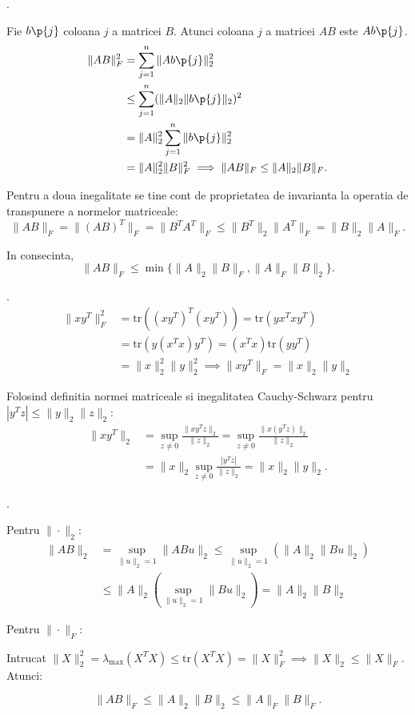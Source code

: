\newpage

\begin{demonstratie}

    . 
    
    Fie $b\p{j}$ coloana $j$ a matricei $B$. Atunci coloana $j$ a matricei $AB$ este $A b\p{j}$.
    \begin{align*}
    \|AB\|_F^2 &= \sum_{j=1}^n \|A b\p{j}\|_2^2 \\
    &\leq \sum_{j=1}^n (\|A\|_2 \|b\p{j}\|_2)^2 \\
    &= \|A\|_2^2 \sum_{j=1}^n \|b\p{j}\|_2^2 \\
    &= \|A\|_2^2 \|B\|_F^2 \implies \|AB\|_F \leq \|A\|_2 \|B\|_F.
    \end{align*}

    Pentru a doua inegalitate se tine cont de proprietatea de invarianta la operatia de transpunere a normelor matriceale:
    $$ \|AB\|_F = \|(AB)^T\|_F = \|B^T A^T\|_F \leq \|B^T\|_2 \|A^T\|_F = \|B\|_2 \|A\|_F. $$

    In consecinta,
    $$ \|AB\|_F \leq \min \{ \|A\|_2 \|B\|_F, \|A\|_F \|B\|_2 \}. $$

    .  
    \begin{align*}
    \|xy^T\|_F^2 &= \text{tr}((xy^T)^T (xy^T)) = \text{tr}(y x^T x y^T) \\
    &= \text{tr}(y (x^T x) y^T) = (x^T x) \text{tr}(yy^T) \\
    &= \|x\|_2^2 \|y\|_2^2 \implies \|xy^T\|_F = \|x\|_2 \|y\|_2
    \end{align*}

    Folosind definitia normei matriceale si inegalitatea Cauchy-Schwarz pentru $ |y^T z| \leq \|y\|_2 \|z\|_2$:
    \begin{align*}
    \|xy^T\|_2 &= \sup_{z \neq 0} \frac{\|x y^T z\|_2}{\|z\|_2} = \sup_{z \neq 0} \frac{\|x (y^T z)\|_2}{\|z\|_2} \\
    &= \|x\|_2 \sup_{z \neq 0} \frac{|y^T z|}{\|z\|_2} = \|x\|_2 \|y\|_2.
    \end{align*}

    .

    Pentru $\|\cdot\|_2$:
    \begin{align*}
    \|AB\|_2 &= \sup_{\|u\|_2=1} \|ABu\|_2 \leq \sup_{\|u\|_2=1} (\|A\|_2 \|Bu\|_2) \\
    &\leq \|A\|_2 \left( \sup_{\|u\|_2=1} \|Bu\|_2 \right) = \|A\|_2 \|B\|_2
    \end{align*}

    Pentru $\|\cdot\|_F$:

    Intrucat $\|X\|_2^2 = \lambda_{\max}(X^TX) \leq \text{tr}(X^TX) = \|X\|_F^2 \implies \|X\|_2 \leq \|X\|_F$. Atunci:

    $$ \|AB\|_F \leq \|A\|_2 \|B\|_2 \leq \|A\|_F \|B\|_F. $$

\end{demonstratie}

